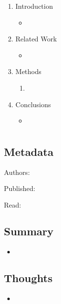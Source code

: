 \documentclass{article}
\begin{document}
\begin{enumerate}
	\item Introduction
	\begin{itemize}
		\item 
	\end{itemize}
	\item Related Work
	\begin{itemize}
		\item 
	\end{itemize}
	\item Methods
	\begin{enumerate}
		\item 
	\end{enumerate}
	\item Conclusions
	\begin{itemize}
		\item 
	\end{itemize}
\end{enumerate}

\pagebreak


\section*{}

\subsection*{Metadata}

\noindent Authors: 

\noindent Published:

\noindent Read:

\subsection*{Summary}
\begin{itemize}
	\item
\end{itemize}

\subsection*{Thoughts}
\begin{itemize}
	\item
\end{itemize}
\end{document}
